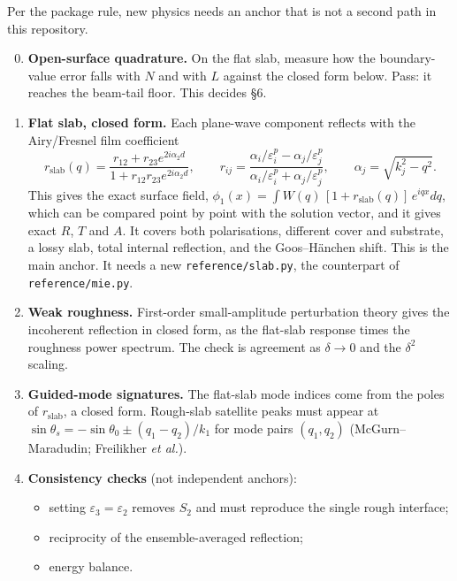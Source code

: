 \documentclass[11pt,a4paper]{article}
\begin{document}
Per the package rule, new physics needs an anchor that is not a second path in this repository.
\begin{enumerate}[label=\textbf{G\arabic*}]
\setcounter{enumi}{-1}
\item \textbf{Open-surface quadrature.} On the flat slab, measure how the
      boundary-value error falls with $N$ and with $L$ against the closed form
      below. Pass: it reaches the beam-tail floor. This decides \S6.
\item \textbf{Flat slab, closed form.} Each plane-wave component reflects with the
      Airy/Fresnel film coefficient
      \[
       r_{\text{slab}}(q) = \frac{r_{12}+r_{23}e^{2i\alpha_2 d}}{1+r_{12}r_{23}e^{2i\alpha_2 d}},\qquad
       r_{ij} = \frac{\alpha_i/\varepsilon_i^{p}-\alpha_j/\varepsilon_j^{p}}{\alpha_i/\varepsilon_i^{p}+\alpha_j/\varepsilon_j^{p}},\qquad
       \alpha_j=\sqrt{k_j^2-q^2}.
      \]
      This gives the exact surface field, $\phi_1(x)=\int W(q)\,[1+r_{\text{slab}}(q)]\,e^{iqx}dq$,
      which can be compared point by point with the solution vector, and it gives exact $R$, $T$ and $A$.
      It covers both polarisations, different cover and substrate, a lossy slab, total internal
      reflection, and the Goos--H\"anchen shift. This is the main anchor. It needs a new
      \texttt{reference/slab.py}, the counterpart of \texttt{reference/mie.py}.
\item \textbf{Weak roughness.} First-order small-amplitude perturbation theory
      gives the incoherent reflection in closed form, as the flat-slab response times the
      roughness power spectrum. The check is agreement as $\delta\to0$ and the $\delta^2$ scaling.
\item \textbf{Guided-mode signatures.} The flat-slab mode indices come from the
      poles of $r_{\text{slab}}$, a closed form. Rough-slab satellite peaks must appear at
      $\sin\theta_s = -\sin\theta_0 \pm (q_1-q_2)/k_1$ for mode pairs $(q_1,q_2)$
      (McGurn--Maradudin; Freilikher \emph{et al.}).
\item \textbf{Consistency checks} (not independent anchors):
  \begin{itemize}
    \item setting $\varepsilon_3=\varepsilon_2$ removes $S_2$ and must reproduce the single rough interface;
    \item reciprocity of the ensemble-averaged reflection;
    \item energy balance.
  \end{itemize}
\end{enumerate}
\end{document}
